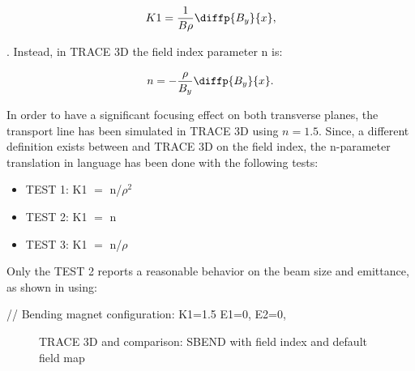 \begin{itemize}
\begin{equation}
K1 = \frac{1}{B\rho}\diffp{B_y}{x},
\end{equation}

. Instead, in TRACE 3D the field index parameter n is:

\begin{equation}
n = -\frac{\rho}{B_y}\diffp{B_y}{x}.
\end{equation}

In order to have a significant focusing effect on both transverse planes, the transport line has been simulated in TRACE 3D using $n = 1.5$. Since, a different definition exists between \opal and TRACE 3D on the field index, the n-parameter translation in \opal language has been done with the following tests:

\begin{itemize}[noitemsep]
\item[] TEST 1: K1 $=$ n/$\rho^2$
\item[] TEST 2: K1 $=$ n
\item[] TEST 3: K1 $=$ n/$\rho$
\end{itemize}

Only the TEST 2 reports a reasonable behavior on the beam size and emittance, as shown in  using:

\begin{example}
// Bending magnet configuration:
K1=1.5
E1=0, E2=0,
\end{example}

\begin{figure}[htbp]
\begin{center}
    \hspace{1.8cm}
    \caption{TRACE 3D and \opal comparison: SBEND with field index and default field map}
    \label{fig:SBEND_FI}
\end{center}
 \end{figure}


\end{itemize}
